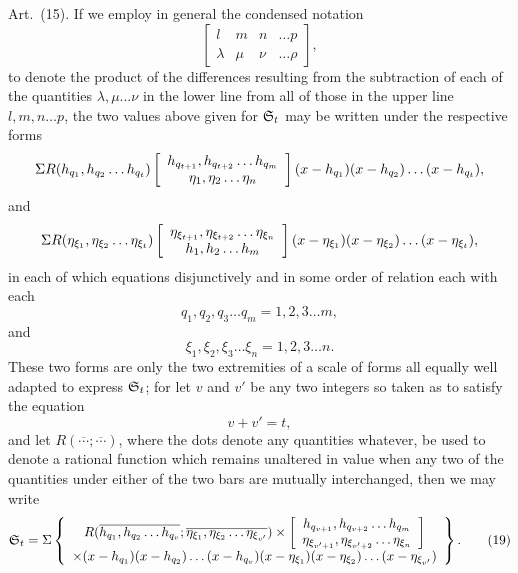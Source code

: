 \documentclass[11pt]{article}
\newcommand{\art}[1]{\par\smallskip\noindent Art.~(#1).\quad}
\begin{document}
\art{15} If we employ in general the condensed notation
\[
\left[\begin{array}{cccc}l&m&n&\ldots p\\ \lambda&\mu&\nu&\ldots \rho\end{array}\right],
\]
to denote the product of the differences resulting from the subtraction of each of the quantities $\lambda,\mu\ldots\nu$ in the lower line from all of those in the upper line $l,m,n\ldots p$, the two values above given for $\mathfrak{S}_t$ may be written under the respective forms
\[
\Sigma R(h_{q_1},h_{q_2}\ldots h_{q_t})
\left[\begin{array}{c}h_{q_{t+1}},h_{q_{t+2}}\ldots h_{q_m}\\\eta_1,\eta_2\ldots\eta_n\end{array}\right]
(x-h_{q_1})(x-h_{q_2})\ldots(x-h_{q_t}),
\]
and
\[
\Sigma R(\eta_{\xi_1},\eta_{\xi_2}\ldots\eta_{\xi_t})
\left[\begin{array}{c}\eta_{\xi_{t+1}},\eta_{\xi_{t+2}}\ldots\eta_{\xi_n}\\h_1,h_2\ldots h_m\end{array}\right]
(x-\eta_{\xi_1})(x-\eta_{\xi_2})\ldots(x-\eta_{\xi_t}),
\]
in each of which equations disjunctively and in some order of relation each with each
\[
q_1,q_2,q_3\ldots q_m=1,2,3\ldots m,
\]
and
\[
\xi_1,\xi_2,\xi_3\ldots\xi_n=1,2,3\ldots n.
\]
These two forms are only the two extremities of a scale of forms all equally well adapted to express $\mathfrak{S}_t$; for let $v$ and $v'$ be any two integers so taken as to satisfy the equation
\[
v+v'=t,
\]
and let $R(\overline{\cdots};\overline{\cdots})$, where the dots denote any quantities whatever, be used to denote a rational function which remains unaltered in value when any two of the quantities under either of the two bars are mutually interchanged, then we may write
\begingroup\scriptsize
\[
\mathfrak{S}_t=\Sigma\left\{
\begin{array}{c}
R(\overline{h_{q_1},h_{q_2}\ldots h_{q_v}};\overline{\eta_{\xi_1},\eta_{\xi_2}\ldots\eta_{\xi_{v'}}})\times
\left[\begin{array}{c}h_{q_{v+1}},h_{q_{v+2}}\ldots h_{q_m}\\\eta_{\xi_{v'+1}},\eta_{\xi_{v'+2}}\ldots\eta_{\xi_n}\end{array}\right]\\[0.4em]
\times(x-h_{q_1})(x-h_{q_2})\ldots(x-h_{q_v})
(x-\eta_{\xi_1})(x-\eta_{\xi_2})\ldots(x-\eta_{\xi_{v'}})
\end{array}\right\}.\tag{19}
\]
\endgroup
\end{document}
